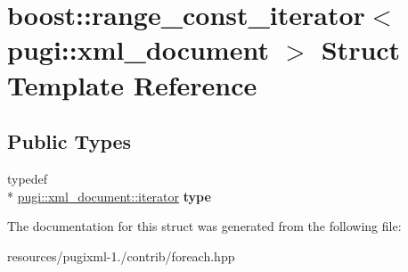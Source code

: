 \hypertarget{structboost_1_1range__const__iterator_3_01pugi_1_1xml__document_01_4}{\section{boost\+:\+:range\+\_\+const\+\_\+iterator$<$ pugi\+:\+:xml\+\_\+document $>$ Struct Template Reference}
\label{structboost_1_1range__const__iterator_3_01pugi_1_1xml__document_01_4}
}
\subsection*{Public Types}
\begin{DoxyCompactItemize}
\item 
\hypertarget{structboost_1_1range__const__iterator_3_01pugi_1_1xml__document_01_4_a64a697b6f5bed6824f5ded8978018da4}{typedef \\*
\hyperlink{classpugi_1_1xml__node__iterator}{pugi\+::xml\+\_\+document\+::iterator} {\bfseries type}}\label{structboost_1_1range__const__iterator_3_01pugi_1_1xml__document_01_4_a64a697b6f5bed6824f5ded8978018da4}

\end{DoxyCompactItemize}


The documentation for this struct was generated from the following file\+:\begin{DoxyCompactItemize}
\item 
resources/pugixml-\/1./contrib/foreach.\+hpp\end{DoxyCompactItemize}
